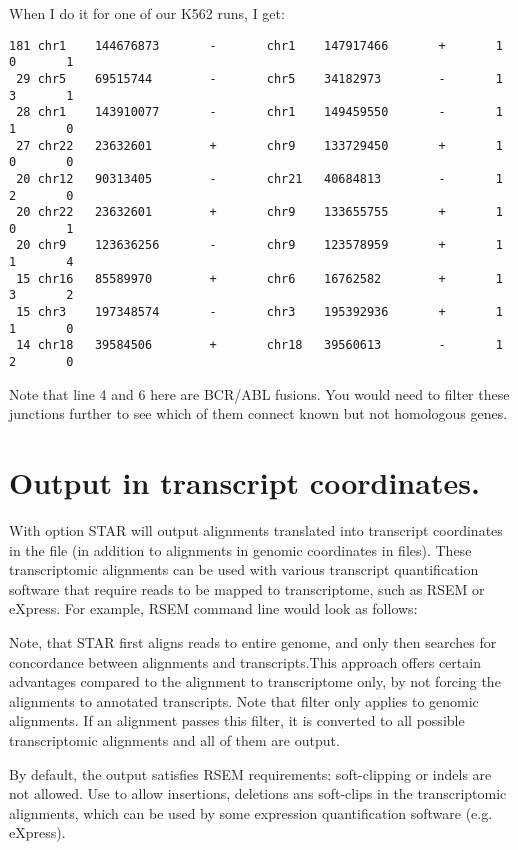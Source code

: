\documentclass[12pt]{article}
\begin{document}
When I do it for one of our K562 runs, I get:
\begin{verbatim}
181 chr1    144676873       -       chr1    147917466       +       1       0       1
 29 chr5    69515744        -       chr5    34182973        -       1       3       1
 28 chr1    143910077       -       chr1    149459550       -       1       1       0
 27 chr22   23632601        +       chr9    133729450       +       1       0       0
 20 chr12   90313405        -       chr21   40684813        -       1       2       0
 20 chr22   23632601        +       chr9    133655755       +       1       0       1
 20 chr9    123636256       -       chr9    123578959       +       1       1       4
 15 chr16   85589970        +       chr6    16762582        +       1       3       2
 15 chr3    197348574       -       chr3    195392936       +       1       1       0
 14 chr18   39584506        +       chr18   39560613        -       1       2       0
\end{verbatim}
Note that line 4 and 6 here are BCR/ABL fusions. You would need to filter these junctions further to see which of them connect known but not homologous genes. 


\section{Output in transcript coordinates.}
With   option STAR will output alignments translated into transcript coordinates in the  file (in addition to alignments in genomic coordinates in  files). These transcriptomic alignments can be used with various transcript quantification software that require reads to be mapped to transcriptome, such as RSEM or eXpress. For example, RSEM command line would look as follows: 

Note, that STAR first aligns reads to entire genome, and only then searches for concordance between alignments and transcripts.This approach offers certain advantages compared to the alignment to transcriptome only, by not forcing the alignments to annotated transcripts. Note that  filter only applies to genomic alignments. If an alignment passes this filter, it is converted to all possible transcriptomic alignments and all of them are output.

By default, the output satisfies RSEM requirements: soft-clipping or indels are not allowed. Use   to allow insertions, deletions ans soft-clips in the transcriptomic alignments, which can be used by some expression quantification software (e.g. eXpress). 
\end{document}
